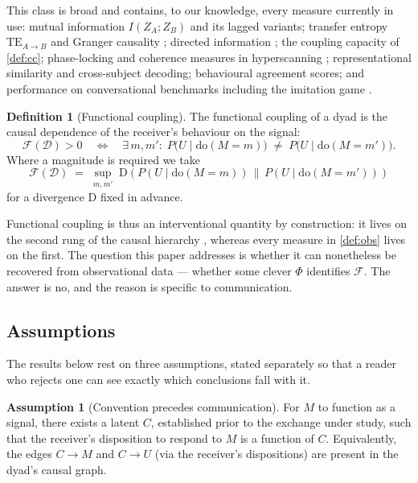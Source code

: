 \documentclass[11pt,a4paper]{article}
\theoremstyle{plain}
\theoremstyle{definition}
\newtheorem{definition}[definition]{Definition}
\newtheorem{assumption}{Assumption}
\theoremstyle{remark}
\newcommand{\Fc}{\mathcal{F}}
\newcommand{\Dy}{\mathcal{D}}
\newcommand{\dop}{\mathrm{do}}
\newcommand{\TE}{\mathrm{TE}}
\begin{document}
This class is broad and contains, to our knowledge, every measure currently in use: mutual
information $I(Z_A;Z_B)$ and its lagged variants; transfer entropy $\TE_{A\to B}$
\citep{schreiber2000measuring} and Granger causality \citep{granger1969investigating};
directed information \citep{permuter2009directed}; the coupling capacity of \cref{def:cc};
phase-locking and coherence measures in hyperscanning \citep{montague2002hyperscanning, hasson2010brain}; representational
similarity and cross-subject decoding; behavioural agreement scores; and performance on
conversational benchmarks including the imitation game \citep{turing1950computing}.

\begin{definition}[Functional coupling]\label{def:fc}
The functional coupling of a dyad is the causal dependence of the receiver's behaviour on
the signal:
\[
\Fc(\Dy) > 0 \quad\Longleftrightarrow\quad
\exists\, m, m' : \; P\big(U \mid \dop(M{=}m)\big) \;\neq\; P\big(U \mid \dop(M{=}m')\big).
\]
Where a magnitude is required we take
\[
\Fc(\Dy) \;=\; \sup_{m,m'} \; \mathrm{D}\!\left(P(U \mid \dop(M{=}m)) \,\big\|\, P(U \mid \dop(M{=}m'))\right)
\]
for a divergence $\mathrm{D}$ fixed in advance.
\end{definition}

Functional coupling is thus an interventional quantity by construction: it lives on the
second rung of the causal hierarchy \citep{pearl2009causality}, whereas every measure in
\cref{def:obs} lives on the first. The question this paper addresses is whether it can
nonetheless be recovered from observational data --- whether some clever $\Phi$ identifies
$\Fc$. The answer is no, and the reason is specific to communication.

\subsection{Assumptions}\label{sec:assumptions}

The results below rest on three assumptions, stated separately so that a reader who rejects
one can see exactly which conclusions fall with it.

\begin{assumption}[Convention precedes communication]\label{as:convention}
For $M$ to function as a signal, there exists a latent $C$, established prior to the
exchange under study, such that the receiver's disposition to respond to $M$ is a function of
$C$. Equivalently, the edges $C \to M$ and $C \to U$ (via the receiver's dispositions) are
present in the dyad's causal graph.
\end{assumption}
\end{document}
